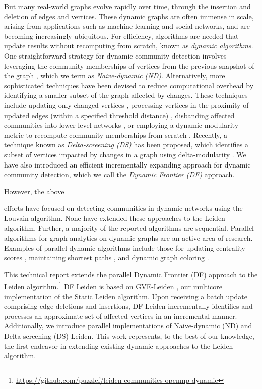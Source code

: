But many real-world graphs evolve rapidly over time, through the insertion and deletion of edges and vertices. These dynamic graphs are often immense in scale, arising from applications such as machine learning and social networks, and are becoming increasingly ubiquitous. For efficiency, algorithms are needed that update results without recomputing from scratch, known as \textit{dynamic algorithms}. One straightforward strategy for dynamic community detection involves leveraging the community memberships of vertices from the previous snapshot of the graph \cite{com-aynaud10, com-chong13, com-shang14, com-zhuang19}, which we term as \textit{Naive-dynamic (ND)}. Alternatively, more sophisticated techniques have been devised to reduce computational overhead by identifying a smaller subset of the graph affected by changes. These techniques include updating only changed vertices \cite{com-aktunc15, com-yin16}, processing vertices in the proximity of updated edges (within a specified threshold distance) \cite{com-held16}, disbanding affected communities into lower-level networks \cite{com-cordeiro16}, or employing a dynamic modularity metric to recompute community memberships from scratch \cite{com-meng16}. Recently, a technique known as \textit{Delta-screening (DS)} has been proposed, which identifies a subset of vertices impacted by changes in a graph using delta-modularity \cite{com-zarayeneh21}. We have also introduced an efficient incrementally expanding approach for dynamic community detection, which we call the \textit{Dynamic Frontier (DF)} approach.

However, the above efforts have focused on detecting communities in dynamic networks using the Louvain algorithm. None have extended these approaches to the Leiden algorithm. Further, a majority of the reported algorithms \cite{com-aynaud10, com-chong13, com-meng16, com-cordeiro16, com-zhuang19, com-zarayeneh21} are sequential. Parallel algorithms for graph analytics on dynamic graphs are an active area of research. Examples of parallel dynamic algorithms include those for updating centrality scores \cite{cent-shao20, cent-regunta21}, maintaining shortest paths \cite{path-zhang17, path-khanda21}, and dynamic graph coloring \cite{color-yuan17, color-bhattacharya18}.

This technical report extends the parallel Dynamic Frontier (DF) approach to the Leiden algorithm.\footnote{\url{https://github.com/puzzlef/leiden-communities-openmp-dynamic}} DF Leiden is based on GVE-Leiden \cite{sahu2023gveleiden}, our multicore implementation of the Static Leiden algorithm. Upon receiving a batch update comprising edge deletions and insertions, DF Leiden incrementally identifies and processes an approximate set of affected vertices in an incremental manner. Additionally, we introduce parallel implementations of Naive-dynamic (ND) and Delta-screening (DS) Leiden. This work represents, to the best of our knowledge, the first endeavor in extending existing dynamic approaches to the Leiden algorithm.




